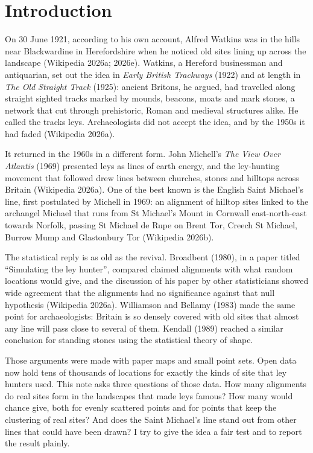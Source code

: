 \documentclass[11pt,a4paper]{article}
\begin{document}
\section{Introduction}

On 30 June 1921, according to his own account, Alfred Watkins was in the hills near Blackwardine in Herefordshire when he noticed old sites lining up across the landscape (Wikipedia 2026a; 2026e). Watkins, a Hereford businessman and antiquarian, set out the idea in \emph{Early British Trackways} (1922) and at length in \emph{The Old Straight Track} (1925): ancient Britons, he argued, had travelled along straight sighted tracks marked by mounds, beacons, moats and mark stones, a network that cut through prehistoric, Roman and medieval structures alike. He called the tracks leys. Archaeologists did not accept the idea, and by the 1950s it had faded (Wikipedia 2026a).

It returned in the 1960s in a different form. John Michell's \emph{The View Over Atlantis} (1969) presented leys as lines of earth energy, and the ley-hunting movement that followed drew lines between churches, stones and hilltops across Britain (Wikipedia 2026a). One of the best known is the English Saint Michael's line, first postulated by Michell in 1969: an alignment of hilltop sites linked to the archangel Michael that runs from St Michael's Mount in Cornwall east-north-east towards Norfolk, passing St Michael de Rupe on Brent Tor, Creech St Michael, Burrow Mump and Glastonbury Tor (Wikipedia 2026b).

The statistical reply is as old as the revival. Broadbent (1980), in a paper titled ``Simulating the ley hunter'', compared claimed alignments with what random locations would give, and the discussion of his paper by other statisticians showed wide agreement that the alignments had no significance against that null hypothesis (Wikipedia 2026a). Williamson and Bellamy (1983) made the same point for archaeologists: Britain is so densely covered with old sites that almost any line will pass close to several of them. Kendall (1989) reached a similar conclusion for standing stones using the statistical theory of shape.

Those arguments were made with paper maps and small point sets. Open data now hold tens of thousands of locations for exactly the kinds of site that ley hunters used. This note asks three questions of those data. How many alignments do real sites form in the landscapes that made leys famous? How many would chance give, both for evenly scattered points and for points that keep the clustering of real sites? And does the Saint Michael's line stand out from other lines that could have been drawn? I try to give the idea a fair test and to report the result plainly.
\end{document}
